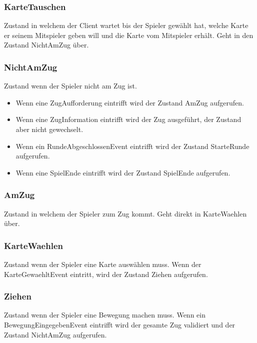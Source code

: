 \documentclass[12pt,halfparskip]{scrartcl}
\begin{document}
\subsubsection{KarteTauschen} %
\label{ssub:kartetauschen}
Zustand in welchem der Client wartet bis der Spieler gewählt hat, welche Karte er seinem Mitspieler geben will und die Karte vom Mitspieler erhält. Geht in den Zustand NichtAmZug über.

\subsubsection{NichtAmZug} %
\label{ssub:nichtamzug}
Zustand wenn der Spieler nicht am Zug ist.
\begin{itemize}
	\item Wenn eine ZugAufforderung eintrifft wird der Zustand AmZug aufgerufen.
	\item Wenn eine ZugInformation eintrifft wird der Zug ausgeführt, der Zustand aber nicht gewechselt.
	\item Wenn ein RundeAbgeschlossenEvent eintrifft wird der Zustand StarteRunde aufgerufen.
	\item Wenn eine SpielEnde eintrifft wird der Zustand SpielEnde aufgerufen.
\end{itemize}

\subsubsection{AmZug} %
\label{ssub:amzug}
Zustand in welchem der Spieler zum Zug kommt. Geht direkt in KarteWaehlen über.

\subsubsection{KarteWaehlen} %
\label{ssub:kartewaehlen}
Zustand wenn der Spieler eine Karte auswählen muss. Wenn der KarteGewaehltEvent eintritt, wird der Zustand Ziehen aufgerufen.

\subsubsection{Ziehen} %
\label{ssub:ziehen}
Zustand wenn der Spieler eine Bewegung machen muss. Wenn ein BewegungEingegebenEvent eintrifft wird der gesamte Zug validiert und der Zustand NichtAmZug aufgerufen.
\end{document}
